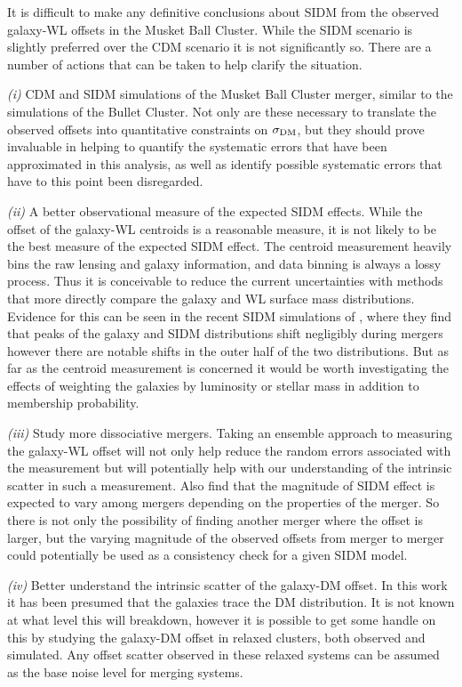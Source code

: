 It is difficult to make any definitive conclusions about SIDM from the observed galaxy-WL offsets in the Musket Ball Cluster.
While the SIDM scenario is slightly preferred over the CDM scenario it is not significantly so.
There are a number of actions that can be taken to help clarify the situation.

\textit{(i)} CDM and SIDM simulations of the Musket Ball Cluster merger, similar to the \citet{Randall:2008hs} simulations of the Bullet Cluster.
Not only are these necessary to translate the observed offsets into quantitative constraints on $\sigma_{\rm DM}$, but they should prove invaluable in helping to quantify the systematic errors that have been approximated in this analysis, as well as identify possible systematic errors that have to this point been disregarded.

\textit{(ii)} A better observational measure of the expected SIDM effects.
While the offset of the galaxy-WL centroids is a reasonable measure, it is not likely to be the best measure of the expected SIDM effect.
The centroid measurement heavily bins the raw lensing and galaxy information, and data binning is always a lossy process.
Thus it is conceivable to reduce the current uncertainties with methods that more directly compare the galaxy and WL surface mass distributions.
Evidence for this can be seen in the recent SIDM simulations of \citet{Kahlhoefer:2013wp}, where they find that peaks of the galaxy and SIDM distributions shift  negligibly during mergers however there are notable shifts in the outer half of the  two distributions.
But as far as the centroid measurement is concerned it would be worth investigating the effects of weighting the galaxies by luminosity or stellar mass in addition to membership probability.

\textit{(iii)} Study more dissociative mergers.
Taking an ensemble approach to measuring the galaxy-WL offset will not only help reduce the random errors associated with the measurement but will potentially help with our understanding of the intrinsic scatter in such a measurement.
Also \citet{Kahlhoefer:2013wp} find that the magnitude of SIDM effect is expected to vary among mergers depending on the properties of the merger.
So there is not only the possibility of finding another merger where the offset is larger, but the varying magnitude of the observed offsets from merger to merger could potentially be used as a consistency check for a given SIDM model.

\textit{(iv)} Better understand the intrinsic scatter of the galaxy-DM offset.
In this work it has been presumed that the galaxies trace the DM distribution. 
It is not known at what level this will breakdown, however it is possible to get some handle on this by studying the galaxy-DM offset in relaxed clusters, both observed and simulated.
Any offset scatter observed in these relaxed systems can be assumed as the base noise level for merging systems.

